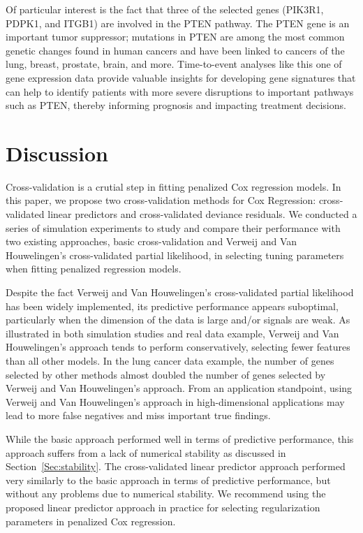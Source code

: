 Of particular interest is the fact that three of the selected genes (PIK3R1, PDPK1, and ITGB1) are involved in the PTEN pathway.  The PTEN gene is an important tumor suppressor; mutations in PTEN are among the most common genetic changes found in human cancers and have been linked to cancers of the lung, breast, prostate, brain, and more.  Time-to-event analyses like this one of gene expression data provide valuable insights for developing gene signatures that can help to identify patients with more severe disruptions to important pathways such as PTEN, thereby informing prognosis and impacting treatment decisions.

\section{Discussion}

Cross-validation is a crutial step in fitting penalized Cox regression models. In this paper, we propose two cross-validation methods for Cox Regression: cross-validated linear predictors and cross-validated deviance residuals. We conducted a series of simulation experiments to study and compare their performance with two existing approaches, basic cross-validation and Verweij and Van Houwelingen's cross-validated partial likelihood, in selecting tuning parameters when fitting penalized regression models.

Despite the fact Verweij and Van Houwelingen's cross-validated partial likelihood has been widely implemented, its predictive performance appears suboptimal, particularly when the dimension of the data is large and/or signals are weak. As illustrated in both simulation studies and real data example, Verweij and Van Houwelingen's approach tends to perform conservatively, selecting fewer features than all other models. In the lung cancer data example, the number of genes selected by other methods almost doubled the number of genes selected by Verweij and Van Houwelingen's approach. From an application standpoint, using Verweij and Van Houwelingen's approach in high-dimensional applications may lead to more false negatives and miss important true findings.

While the basic approach performed well in terms of predictive performance, this approach suffers from a lack of numerical stability as discussed in Section~\ref{Sec:stability}. The cross-validated linear predictor approach performed very similarly to the basic approach in terms of predictive performance, but without any problems due to numerical stability.  We recommend using the proposed linear predictor approach in practice for selecting regularization parameters in penalized Cox regression.

